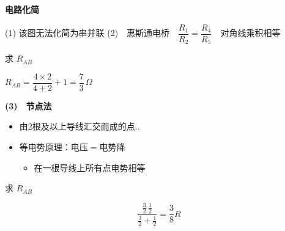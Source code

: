 \textbf{电路化简}

\noindent (1)
\noindent 该图无法化简为串并联
\noindent (2)　惠斯通电桥　$\dfrac{R_1}{R_2}=\dfrac{R_4}{R_5}$　对角线乘积相等
\begin{problem}
求 $R_{AB}$
\begin{solution}
$R_{AB}=\dfrac{4\times2}{4+2}+1=\dfrac{7}{3}\,\Omega$
\end{solution}
\end{problem}
\noindent \textbf{(3)　节点法}
\begin{itemize}
\item 由2根及以上导线汇交而成的点..
\item 等电势原理：电压$=$电势降
\begin{itemize}
\item 在一根导线上所有点电势相等
\end{itemize}
\end{itemize}
\begin{problem}
求 $R_{AB}$
\begin{solution}
\[ \dfrac{\frac{3}{2}\,\frac{1}{2}}{\frac{3}{2}+\frac{1}{2}}=\dfrac{3}{8}R \]%
\end{solution}
\end{problem}
